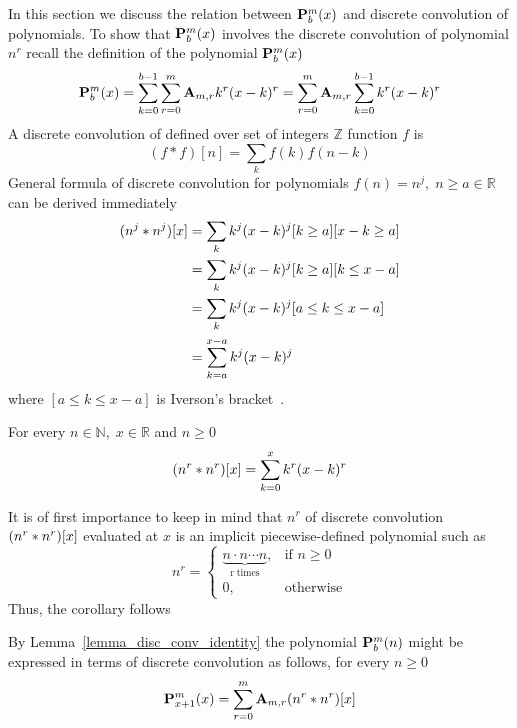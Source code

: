 In this section we discuss the relation between ${\mathbf{P}}\sp{m} \sb{b}(x)$ and discrete convolution of
polynomials.
To show that ${\mathbf{P}}\sp{m} \sb{b}(x)$ involves the discrete convolution of polynomial $n^r$
recall the definition of the polynomial ${\mathbf{P}}\sp{m} \sb{b}(x)$
\begin{equation*}
    {\mathbf{P}}\sp{m} \sb{b}(x) = \sum_{k=0}^{b-1} \sum_{r=0}^{m} {\mathbf{A}} \sb{m,r} k^r (x-k)^r
    = \sum_{r=0}^{m} {\mathbf{A}} \sb{m,r} \sum_{k=0}^{b-1} k^r (x-k)^r
\end{equation*}
A discrete convolution of defined over set of integers $\mathbb{Z}$ function $f$ is
\begin{equation*}
(f \ast f)[n]
    = \sum_{k} f(k) f(n-k)
\end{equation*}
General formula of discrete convolution for polynomials $f(n) = n^j, \; n\geq a \in \mathbb{R}$
can be derived immediately
\begin{equation*}
    \begin{split}
        (n \sp{j} \ast n \sp{j}) [x]
        &=\sum_{k} k^j (x-k)^j [k\geq a][x-k\geq a] \\
        &=\sum_{k} k^j (x-k)^j [k\geq a][k\leq x-a] \\
        &=\sum_{k} k^j (x-k)^j [a \leq k \leq x-a] \\
        &=\sum_{k=a}^{x-a} k^j (x-k)^j
    \end{split}
\end{equation*}
where $[a \leq k \leq x-a]$ is Iverson's bracket~\cite{iverson_apl, knuth_two_notes_on_notation}.
\begin{lem}
    \label{lemma_disc_conv_identity}
    For every $n\in\mathbb{N}, \; x\in\mathbb{R}$ and $n\geq 0$
    \[
        (n \sp{r} \ast n \sp{r}) [x] = \sum_{k=0}^{x} k^r (x-k)^r
    \]
\end{lem}
It is of first importance to keep in mind that  $n^r$ of discrete convolution $(n \sp{r} \ast n \sp{r}) [x]$ evaluated at $x$
is an implicit piecewise-defined polynomial such as
\begin{equation*}
    n^{r} =
    \begin{cases}
        \underbrace{n \cdot n \cdots n}_{\mathrm{r \; times}}, & \mbox{if } n \geq 0 \\
        0, & \mbox{otherwise}
    \end{cases}
\end{equation*}
Thus, the corollary follows
\begin{cor}
    \label{cor_polynomial_p_and_macaulay_convolution}
    By Lemma~\ref{lemma_disc_conv_identity} the polynomial ${\mathbf{P}}\sp{m} \sb{b}(n)$ might be expressed in terms
    of discrete convolution as follows, for every $n\geq 0$
    \begin{align*}
        {\mathbf{P}}\sp{m} \sb{x+1}(x) = \sum_{r=0}^{m} {\mathbf{A}} \sb{m,r} (n \sp{r} \ast n \sp{r}) [x]
    \end{align*}
\end{cor}
